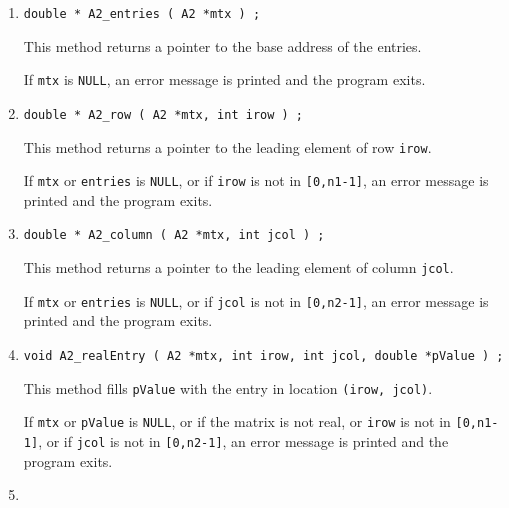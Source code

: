 \begin{enumerate}
\item
\begin{verbatim}
double * A2_entries ( A2 *mtx ) ;
\end{verbatim}
This method returns a pointer to the base address of the entries.
\par {}
If {\tt mtx} is {\tt NULL}, 
an error message is printed and the program exits.
\item
\begin{verbatim}
double * A2_row ( A2 *mtx, int irow ) ;
\end{verbatim}
This method returns a pointer to the leading element of row {\tt irow}.
\par {}
If {\tt mtx} or {\tt entries} is {\tt NULL}, 
or if {\tt irow} is not in {\tt [0,n1-1]},
an error message is printed and the program exits.
\item
\begin{verbatim}
double * A2_column ( A2 *mtx, int jcol ) ;
\end{verbatim}
This method returns a pointer to the leading element 
of column {\tt jcol}.
\par {}
If {\tt mtx} or {\tt entries} is {\tt NULL}, 
or if {\tt jcol} is not in {\tt [0,n2-1]},
an error message is printed and the program exits.
\item
\begin{verbatim}
void A2_realEntry ( A2 *mtx, int irow, int jcol, double *pValue ) ;
\end{verbatim}
This method fills {\tt *pValue} with the entry in 
location {\tt (irow, jcol)}.
\par {}
If {\tt mtx} or {\tt pValue} is {\tt NULL},
or if the matrix is not real,
or {\tt irow} is not in {\tt [0,n1-1]}, 
or if {\tt jcol} is not in {\tt [0,n2-1]},
an error message is printed and the program exits.
\item
\begin{verbatim}

\end{verbatim}
\end{enumerate}
